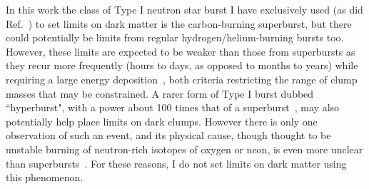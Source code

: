 \documentclass[
    twocolumn,
	prd,
        amssymb,
	preprintnumbers,
	secnumarabic,
	nofootinbib,
	superscriptaddress]{revtex4-1}
\begin{document}
In this work the class of Type I neutron star burst I have exclusively used (as did Ref.~\cite{MACROSidhu2020}) to set limits on dark  matter is the carbon-burning superburst, but there could potentially be limits from regular hydrogen/helium-burning bursts too. 
However, these limits are expected to be weaker than those from superbursts as they recur more frequently (hours to days, as opposed to months to years) while requiring a large energy deposition~\cite{supburst:underZanding:2017ugu}, both criteria restricting the range of clump masses that may be constrained.
A rarer form of Type I burst dubbed ``hyperburst", with a power about 100 times that of a superburst~\cite{hyperburstPage:2022ikz}, may also potentially help place limits on dark clumps.
However there is only one observation of such an event, and its physical cause, though thought to be unstable burning of neutron-rich isotopes of oxygen or neon, is even more unclear than superbursts~\cite{hyperburstPage:2022ikz}. 
For these reasons, I do not set limits on dark matter using this phenomenon.
\end{document}
